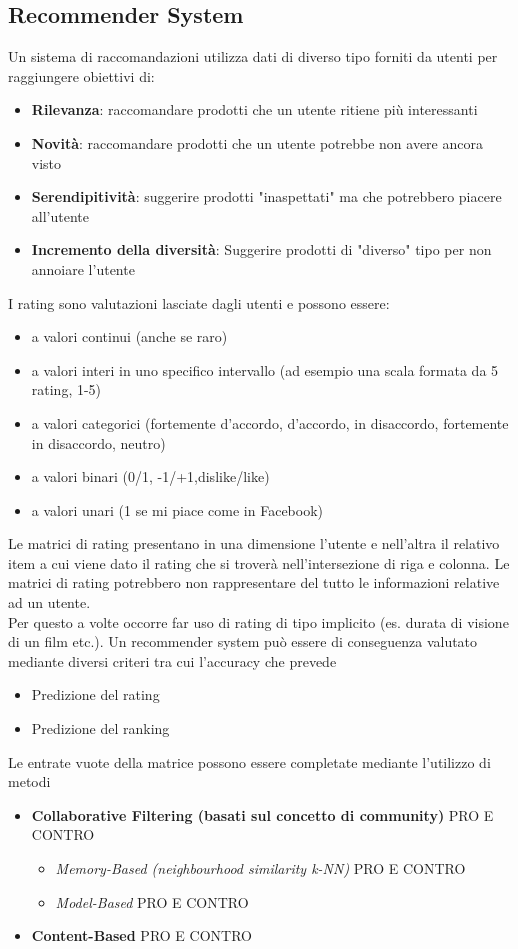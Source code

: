 \documentclass[12pt]{article}
\begin{document}
\subsection{Recommender System}
Un sistema di raccomandazioni utilizza dati di diverso tipo forniti da utenti per raggiungere obiettivi di:
\begin{itemize}
    \item \textbf{Rilevanza}: raccomandare prodotti che un utente ritiene più interessanti
    \item \textbf{Novità}: raccomandare prodotti che un utente potrebbe non avere ancora visto
    \item \textbf{Serendipitività}: suggerire prodotti "inaspettati" ma che potrebbero piacere all'utente
    \item \textbf{Incremento della diversità}: Suggerire prodotti di "diverso" tipo per non annoiare l'utente
\end{itemize}
I rating sono valutazioni lasciate dagli utenti e possono essere:
\begin{itemize}
    \item a valori continui (anche se raro)
    \item a valori interi in uno specifico intervallo (ad esempio una scala formata da 5 rating, 1-5)
    \item a valori categorici (fortemente d’accordo, d’accordo, in disaccordo, fortemente in disaccordo, neutro)
    \item a valori binari (0/1, -1/+1,dislike/like)
    \item a valori unari (1 se mi piace come in Facebook)
\end{itemize}
Le matrici di rating presentano in una dimensione l'utente e nell'altra il relativo item a cui viene dato il rating che si troverà nell'intersezione di riga e colonna. Le matrici di rating potrebbero non rappresentare del tutto le informazioni relative ad un utente. \\Per questo a volte occorre far uso di rating di tipo implicito (es. durata di visione di un film etc.). Un recommender system può essere di conseguenza valutato mediante diversi criteri tra cui l'accuracy che prevede
\begin{itemize}
    \item Predizione del rating
    \item Predizione del ranking
\end{itemize}
Le entrate vuote della matrice possono essere completate mediante l'utilizzo di metodi
\begin{itemize}
    \item \textbf{Collaborative Filtering (basati sul concetto di community)} PRO E CONTRO
          \begin{itemize}
              \item \textit{Memory-Based (neighbourhood similarity k-NN)} PRO E CONTRO
              \item \textit{Model-Based} PRO E CONTRO
          \end{itemize}
    \item \textbf{Content-Based} PRO E CONTRO
\end{itemize}
\newpage
\end{document}

